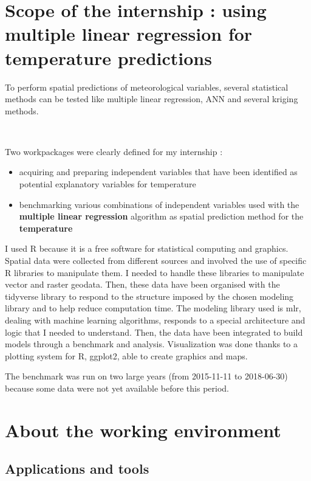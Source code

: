 \documentclass[12pt,twoside]{reedthesis}
\providecommand{\tightlist}{%
  \setlength{\itemsep}{0pt}\setlength{\parskip}{0pt}}
\theoremstyle{definition}
\theoremstyle{definition}
\theoremstyle{definition}
\theoremstyle{remark}
\begin{document}
\section{Scope of the internship : using multiple linear regression for
temperature
predictions}\label{scope-of-the-internship-using-multiple-linear-regression-for-temperature-predictions}

To perform spatial predictions of meteorological variables, several
statistical methods can be tested like multiple linear regression, ANN
and several kriging methods.

~

Two workpackages were clearly defined for my internship :
\begin{itemize}
\tightlist
\item
  acquiring and preparing independent variables that have been
  identified as potential explanatory variables for temperature
\item
  benchmarking various combinations of independent variables used with
  the \textbf{multiple linear regression} algorithm as spatial
  prediction method for the \textbf{temperature}
\end{itemize}
I used R because it is a free software for statistical computing and
graphics. Spatial data were collected from different sources and
involved the use of specific R libraries to manipulate them. I needed to
handle these libraries to manipulate vector and raster geodata. Then,
these data have been organised with the tidyverse library to respond to
the structure imposed by the chosen modeling library and to help reduce
computation time. The modeling library used is mlr, dealing with machine
learning algorithms, responds to a special architecture and logic that I
needed to understand. Then, the data have been integrated to build
models through a benchmark and analysis. Visualization was done thanks
to a plotting system for R, ggplot2, able to create graphics and maps.

The benchmark was run on two large years (from 2015-11-11 to 2018-06-30)
because some data were not yet available before this period.

\section{About the working
environment}\label{about-the-working-environment}

\subsection{Applications and tools}\label{applications-and-tools}
\end{document}
